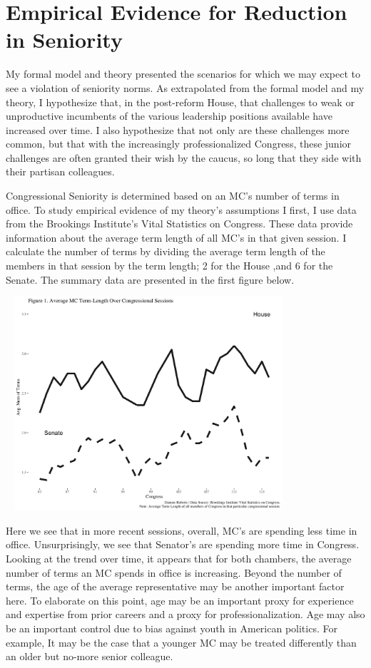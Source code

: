 \documentclass [12pt]{article}
\begin{document}
\section*{Empirical Evidence for Reduction in Seniority}

My formal model and theory presented the scenarios for which we may expect to see a violation of seniority norms. As extrapolated from the formal model and my theory, I hypothesize that, in the post-reform House, that challenges to weak or unproductive incumbents of the various leadership positions available have increased over time. I also hypothesize that not only are these challenges more common, but that with the increasingly professionalized Congress, these junior challenges are often granted their wish by the caucus, so long that they side with their partisan colleagues. 

Congressional Seniority is determined based on an MC's number of terms in office. To study empirical evidence of my theory's assumptions I first, I use data from the Brookings Institute's Vital Statistics on Congress. These data provide information about the average term length of all MC's in that given session. I calculate the number of terms by dividing the average term length of the members in that session by the term length; 2 for the House ,and 6 for the Senate. The summary data are presented in the first figure below.

\includegraphics[height=300, width=400]{../figures/term-time-plot.png}

Here we see that in more recent sessions, overall, MC's are spending less time in office. Unsurprisingly, we see that Senator's are spending more time in Congress. Looking at the trend over time, it appears that for both chambers, the average number of terms an MC spends in office is increasing. Beyond the number of terms, the age of the average representative may be another important factor here. To elaborate on this point, age may be an important proxy for experience and expertise from prior careers and a proxy for professionalization. Age may also be an important control due to bias against youth in American politics. For example, It may be the case that a younger MC may be treated differently than an older but no-more senior colleague. 
\end{document}
